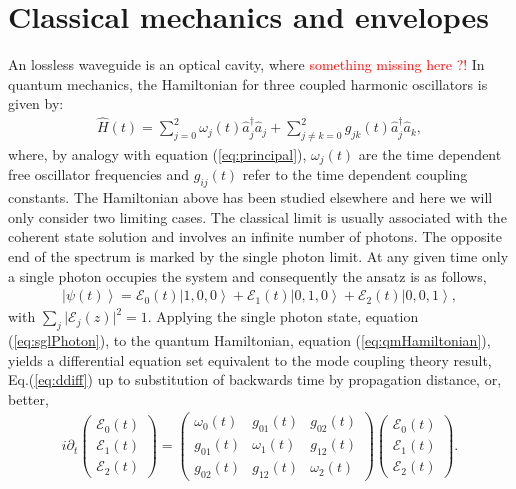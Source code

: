\documentclass[9pt,twocolumn,twoside]{osajnl}
\begin{document}
\section{Classical mechanics and envelopes}
An lossless waveguide is an optical cavity, where
\textcolor{red}{something missing here ?!}\newline  
In quantum mechanics, the Hamiltonian for three coupled harmonic oscillators is given by:
\begin{eqnarray}\label{eq:qmHamiltonian}
	\hat{H}(t) = \sum_{j=0}^{2} \omega_j(t) \hat{a}^{\dagger}_j \hat{a}_{j} + \sum_{j\neq k=0}^{2} g_{jk}(t) \hat{a}^{\dagger}_j \hat{a}_k,
\end{eqnarray}
where, by analogy with equation (\ref{eq:principal}),  $\omega_j(t)$ are the time dependent free oscillator
frequencies and $g_{ij}(t)$ refer to the time dependent coupling constants. The Hamiltonian above has been studied 
elsewhere and here we will only consider two limiting cases.
The classical limit is usually associated with the coherent state solution and involves an infinite number of photons. 
The opposite end of the spectrum is marked by the single photon 
limit. At any given time only a single photon occupies the system 
and consequently the ansatz is as follows,
\begin{eqnarray}\label{eq:sglPhoton}
	\left\vert \psi(t) \right\rangle = \mathcal{E}_{0}(t) \left\vert 1, 0, 0 \right\rangle  +
	\mathcal{E}_{1}(t) \left\vert 0,1,0 \right\rangle + \mathcal{E}_{2}(t) \left\vert 0,0,1 \right\rangle,
\end{eqnarray}
with $ \sum_{j} \vert \mathcal{E}_{j}(z) \vert^2 = 1$. 
Applying the single photon state, equation (\ref{eq:sglPhoton}), to the 
quantum Hamiltonian, equation (\ref{eq:qmHamiltonian}), 
yields a differential equation set equivalent to the mode coupling theory result, Eq.(\ref{eq:ddiff}) up to substitution of backwards time by propagation distance, or, better, 
\begin{eqnarray} \label{eq:}
	i \partial_t	
	\left( \begin{array}{c} 
		\mathcal{E}_{0}(t) \\
		\mathcal{E}_{1}(t) \\
		\mathcal{E}_{2}(t)
	\end{array} \right) =
	\left( \begin{array}{ccc} 
		\omega_{0}(t)  & g_{01}(t) & g_{02}(t) \\
		g_{01}(t) & \omega_{1}(t) & g_{12}(t) \\
		g_{02}(t) & g_{12}(t) & \omega_{2}(t)
	\end{array} \right)
	\left( \begin{array}{c} 
		\mathcal{E}_{0}(t) \\
		\mathcal{E}_{1}(t) \\
		\mathcal{E}_{2}(t)
	\end{array} \right) .
\end{eqnarray}
\end{document}
